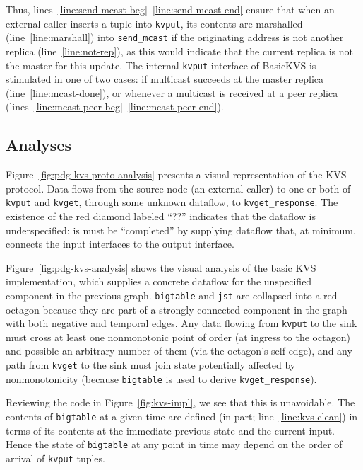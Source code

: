Thus, lines~\ref{line:send-mcast-beg}--\ref{line:send-mcast-end} ensure that when an external caller inserts a tuple into
\texttt{kvput}, its contents are marshalled (line~\ref{line:marshall}) into \texttt{send\_mcast}
if the originating address is not another replica (line~\ref{line:not-rep}), as this would indicate
that the current replica is not the master for this update.  
The internal
\texttt{kvput} interface of BasicKVS is stimulated in one of two cases: if multicast succeeds
at the master replica (line~\ref{line:mcast-done}), or whenever a multicast is received at 
a peer replica (lines~\ref{line:mcast-peer-beg}--\ref{line:mcast-peer-end}).

\subsection{Analyses}
Figure~\ref{fig:pdg-kvs-proto-analysis} presents a visual representation of the KVS protocol.  Data
flows from the source node (an external caller) to one or both of \texttt{kvput} and 
\texttt{kvget}, through some unknown dataflow, to \texttt{kvget\_response}.
The existence of the red diamond labeled ``??'' indicates that the dataflow is underspecified:
is must be ``completed'' by supplying dataflow that, at minimum, connects the input 
interfaces to the output interface.

Figure~\ref{fig:pdg-kvs-analysis} shows the visual analysis of the basic KVS
implementation, which supplies a concrete dataflow for the unspecified component
in the previous graph.  \texttt{bigtable} and \texttt{jst} are collapsed into a
red octagon because they are part of a strongly connected component in the graph
with both negative and temporal edges.  Any data flowing from \texttt{kvput} to
the sink must cross at least one nonmonotonic point of order (at ingress to the
octagon) and possible an arbitrary number of them (via the octagon's self-edge),
and any path from \texttt{kvget} to the sink must join state potentially
affected by nonmonotonicity (because \texttt{bigtable} is used to derive
\texttt{kvget\_response}).

Reviewing the code in Figure~\ref{fig:kvs-impl}, we see that this is
unavoidable.  The contents of \texttt{bigtable} at a given time are defined (in
part; line~\ref{line:kvs-clean}) in terms of its contents at the immediate
previous state and the current input.  Hence the state of \texttt{bigtable} at
any point in time may depend on the order of arrival of \texttt{kvput} tuples.

